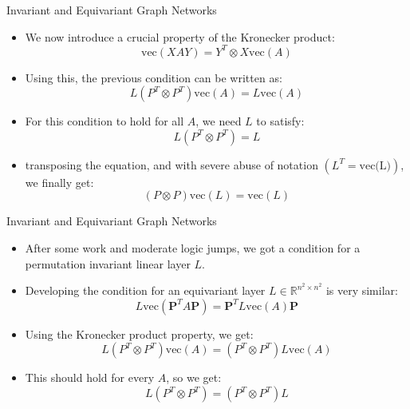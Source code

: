 \documentclass{beamer}
\begin{document}
\begin{frame}{Invariant and Equivariant Graph Networks}
    \begin{itemize}
        \setlength{\itemsep}{\fill}
        \item We now introduce a crucial property of the Kronecker product:
        \[ \text{vec}(XAY)= Y^T\otimes X\text{vec}(A)\]
        \item Using this, the previous condition can be written as:
        \[ L(P^T\otimes P^T)\text{vec}(A) = L\text{vec}(A) \]
        \item For this condition to hold for all $A$, we need $L$ to satisfy:
        \[ L(P^T\otimes P^T) = L \]
        \item transposing the equation, and with severe abuse of notation $(L^T = \text{vec(L)})$, we finally get:
        \[ (P\otimes P)\text{vec}(L) = \text{vec}(L) \]
    \end{itemize}
\end{frame}
\begin{frame}{Invariant and Equivariant Graph Networks}
    \begin{itemize}
        \setlength{\itemsep}{\fill}
        \item After some work and moderate logic jumps, we got a condition for a permutation invariant linear layer $L$.
        \item Developing the condition for an equivariant layer $L \in \mathbb{R}^{n^2 \times n^2}$ is very similar:
        \[ L\text{vec}(\boldsymbol{P}^T A\boldsymbol{P}) =\boldsymbol{P}^T L\text{vec}(A) \boldsymbol{P}\]
        \item Using the Kronecker product property, we get:
        \[ L(P^T\otimes P^T)\text{vec}(A) = (P^T\otimes P^T)L\text{vec}(A) \]
        \item This should hold for every $A$, so we get:
        \[ L(P^T\otimes P^T) = (P^T\otimes P^T)L \]
    \end{itemize}
\end{frame}
\end{document}
